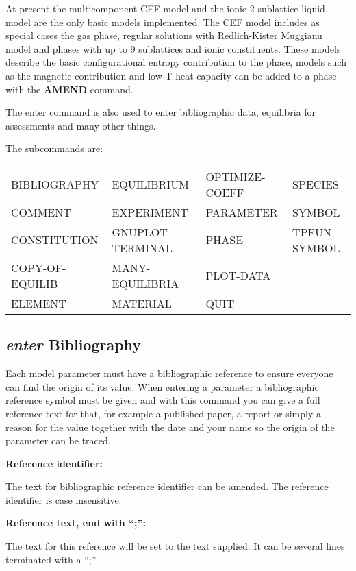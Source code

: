 \documentclass[11pt]{article}
\begin{document}
At present the multicomponent CEF model and the ionic 2-sublattice
liquid model are the only basic models implemented.  The CEF model
includes as special cases the gas phase, regular solutions with
Redlich-Kister Muggianu model and phases with up to 9 sublattices and
ionic constituents.  These models describe the basic configurational
entropy contribution to the phase, models such as the magnetic
contribution and low T heat capacity can be added to a phase with the
{\bf AMEND} command.

The enter command is also used to enter bibliographic data, equilibria
for assessments and many other things.

The subcommands are:

{\small
\begin{tabular}{llll}
 BIBLIOGRAPHY     & EQUILIBRIUM      & OPTIMIZE-COEFF~   & SPECIES\\
 COMMENT          & EXPERIMENT       & PARAMETER        & SYMBOL\\ 
 CONSTITUTION     & GNUPLOT-TERMINAL~ & PHASE            & TPFUN-SYMBOL\\ 
 COPY-OF-EQUILIB~  & MANY-EQUILIBRIA  & PLOT-DATA\\
 ELEMENT          & MATERIAL         & QUIT\\
\end{tabular}
}

\hypertarget{Enter bibliography}{}
\subsection{{\em enter} Bibliography}\label{sc:bibref}

Each model parameter must have a bibliographic reference to ensure
everyone can find the origin of its value.  When entering a parameter
a bibliographic reference symbol must be given and with this command
you can give a full reference text for that, for example a published
paper, a report or simply a reason for the value together with the
date and your name so the origin of the parameter can be traced.

{\bf Reference identifier:}

The text for bibliographic reference identifier can be amended.  The
reference identifier is case insensitive.

{\bf Reference text, end with ``;'':}

The text for this reference will be set to the text supplied.  It can be
several lines terminated with a ``;''
\end{document}
